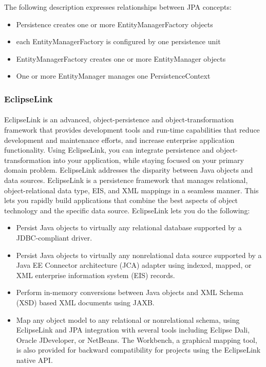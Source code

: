 \begin{itemize}
The following description expresses relationships between JPA concepts:
\begin{itemize}
\item Persistence creates one or more EntityManagerFactory objects
\item each EntityManagerFactory is configured by one persistence unit
\item EntityManagerFactory creates one or more EntityManager objects
\item One or more EntityManager manages one PersistenceContext
\end{itemize}
\end{itemize}
\subsubsection{EclipseLink}
\paragraph{}
EclipseLink is an advanced, object-persistence and object-transformation
framework that provides development tools and run-time capabilities that reduce
development and maintenance efforts, and increase enterprise application
functionality. Using EclipseLink, you can integrate persistence and
object-transformation into your application, while staying focused on your primary domain problem. EclipseLink addresses the disparity between Java objects and data sources. EclipseLink is a persistence framework that manages relational, object-relational data type, EIS, and XML mappings in a seamless manner. This lets you rapidly build applications that combine the best aspects of object technology and the specific data source. EclipseLink lets you do the following:

\begin{itemize}
\item Persist Java objects to virtually any relational database supported by a JDBC-compliant driver.
\item Persist Java objects to virtually any nonrelational data source supported by a Java EE Connector architecture (JCA) adapter using indexed, mapped, or XML enterprise information system (EIS) records.
\item Perform in-memory conversions between Java objects and XML Schema (XSD) based XML documents using JAXB.
\item Map any object model to any relational or nonrelational schema, using EclipseLink and JPA integration with several tools including Eclipse Dali, Oracle JDeveloper, or NetBeans. The Workbench, a graphical mapping tool, is also provided for backward compatibility for projects using the EclipseLink native API.
\end{itemize}


